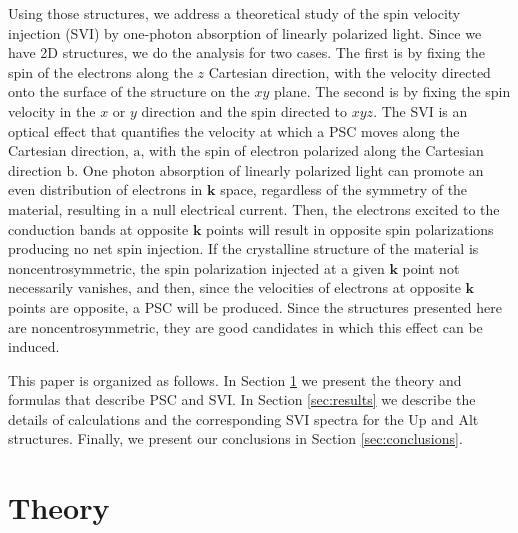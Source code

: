\documentclass[floatfix,prb,aps,superscriptaddress,showpacs,11pt,preprint,letterpaper]{revtex4}
\begin{document}
Using those structures, we address a theoretical study of the spin velocity
injection (SVI) by one-photon absorption of linearly polarized light. Since we
have 2D structures, we do the analysis for two cases. The first is by fixing the
spin of the electrons along the $z$ Cartesian direction, with the velocity
directed onto the surface of the structure on the $xy$ plane. The second is by
fixing the spin velocity in the $x$ or $y$ direction and the spin directed to
$xyz$.
The SVI is an optical effect that quantifies the velocity at which a PSC moves
along the Cartesian direction, $\mathrm{a}$, with the spin of electron polarized
along the Cartesian direction $\mathrm{b}$. One photon absorption of linearly
polarized light can promote an even distribution of electrons in $\mathbf{k}$
space, regardless of the symmetry of the material, resulting in a null
electrical current.\cite{bhatPRL05} Then, the electrons excited to the
conduction bands at opposite $\mathbf{k}$ points will result in opposite spin
polarizations producing no net spin injection.\cite{bhatPRL05} If the
crystalline structure of the material is noncentrosymmetric, the spin
polarization injected at a given $\mathbf{k}$ point not necessarily
vanishes,\cite{alvaradoPRL85, schmiedeskampPRL88} and then, since the velocities
of electrons at opposite $\mathbf{k}$ points are opposite, a PSC will be
produced. Since the structures presented here are noncentrosymmetric, they are
good candidates in which this effect can be induced.

This paper is organized as follows. In Section \ref{sec:theory} we present the
theory and formulas that describe PSC and SVI. In Section \ref{sec:results} we
describe the details of calculations and the corresponding SVI spectra for the
Up and Alt structures. Finally, we present our conclusions in
Section \ref{sec:conclusions}.



\section{Theory} %
\label{sec:theory}
\end{document}
